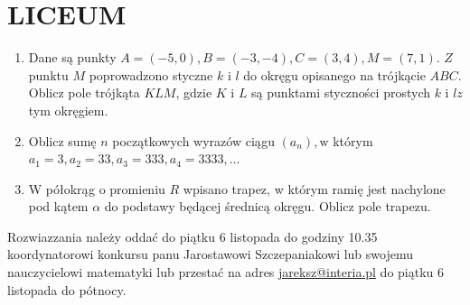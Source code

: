 \documentclass[10pt]{article}
\begin{document}
\section*{LICEUM}
\begin{enumerate}
  \item Dane są punkty \(A=(-5,0), B=(-3,-4), C=(3,4), M=(7,1)\). \(Z\) punktu \(M\) poprowadzono styczne \(k\) i \(l\) do okręgu opisanego na trójkącie \(A B C\). Oblicz pole trójkąta \(K L M\), gdzie \(K\) i \(L\) są punktami styczności prostych \(k\) i \(l z\) tym okręgiem.
  \item Oblicz sumę \(n\) początkowych wyrazów ciągu \(\left(a_{n}\right), \mathrm{w}\) którym\\
\(a_{1}=3, a_{2}=33, a_{3}=333, a_{4}=3333, \ldots\)
  \item W półokrąg o promieniu \(R\) wpisano trapez, w którym ramię jest nachylone pod kątem \(\alpha\) do podstawy będącej średnicą okręgu. Oblicz pole trapezu.
\end{enumerate}

Rozwiazzania należy oddać do piątku 6 listopada do godziny 10.35 koordynatorowi konkursu panu Jarostawowi Szczepaniakowi lub swojemu nauczycielowi matematyki lub przestać na adres \href{mailto:jareksz@interia.pl}{jareksz@interia.pl} do piątku 6 listopada do pótnocy.
\end{document}
